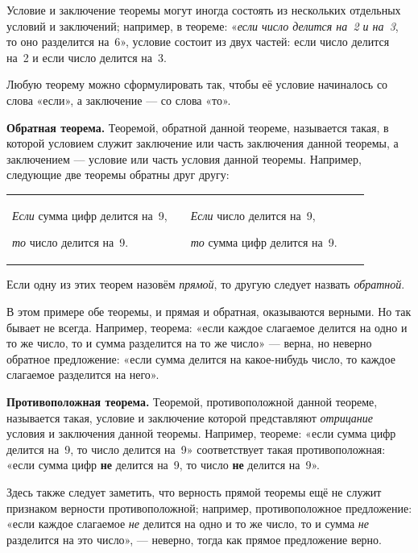 Условие и заключение теоремы могут иногда состоять из нескольких отдельных условий и заключений; например, в теореме: «\emph{если число делится на~2 и на~3}, то оно разделится на~6», условие состоит из двух частей: если число делится на~2 и если число делится на~3.

Любую теорему можно сформулировать так, чтобы её условие начиналось со слова «если», а заключение --- со слова «то».

 \textbf{Обратная теорема.} Теоремой, обратной данной теореме, называется такая, в которой условием служит заключение или часть заключения данной теоремы, а заключением --- условие или часть условия данной теоремы. Например, следующие две теоремы обратны друг другу:

\begin{center}
    \begin{tabular}{@{}p{0.44\linewidth}|p{0.44\linewidth}@{}}
        \emph{Если} сумма цифр делится на~9,\par \emph{то} число делится на~9. &
        \emph{Если} число делится на~9,\par \emph{то} сумма цифр делится на~9.
    \end{tabular}
\end{center}

Если одну из этих теорем назовём \emph{прямой}, то другую следует назвать \emph{обратной}.

В этом примере обе теоремы, и прямая и обратная, оказываются верными. Но так бывает не всегда. Например, теорема: «если каждое слагаемое делится на одно и то же число, то и сумма разделится на то же число» --- верна, но неверно обратное предложение: «если сумма делится на какое-нибудь число, то каждое слагаемое разделится на него».

 \textbf{Противоположная теорема.} Теоремой, противоположной данной теореме, называется такая, условие и заключение которой представляют \emph{отрицание} условия и заключения
данной теоремы. Например, теореме: «если сумма цифр делится на~9, то число делится на~9» соответствует такая противоположная: «если сумма цифр \textbf{не} делится на~9, то число \textbf{не} делится на~9».

Здесь также следует заметить, что верность прямой теоремы ещё не служит признаком верности противоположной; например, противоположное предложение: «если каждое слагаемое \emph{не} делится на одно и то же число, то и сумма \emph{не} разделится на это число», --- неверно, тогда как прямое предложение верно.


